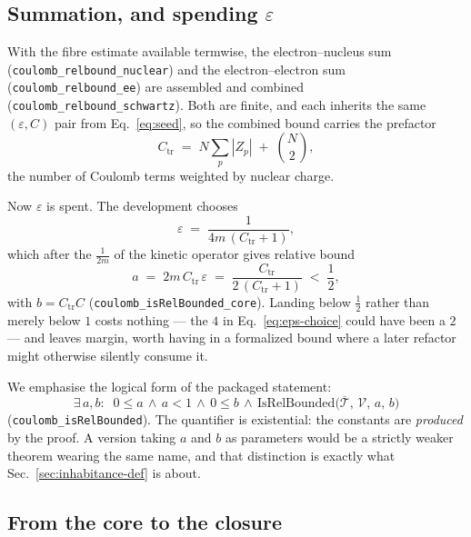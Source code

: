 \documentclass[aps,prd,reprint,nofootinbib,superscriptaddress]{revtex4-2}
\newcommand{\thm}[1]{\texttt{#1}}   %
\begin{document}
\subsection{Summation, and spending $\varepsilon$}
\label{sec:summation}

With the fibre estimate available termwise, the electron--nucleus sum
(\thm{coulomb\_relbound\_nuclear}) and the electron--electron sum (\thm{coulomb\_relbound\_ee}) are
assembled and combined (\thm{coulomb\_relbound\_schwartz}). Both are finite, and each inherits the
same $(\varepsilon,C)$ pair from Eq.~\eqref{eq:seed}, so the combined bound carries the prefactor
\begin{equation}
C_{\mathrm{tr}} \;=\; N\sum_{p}|Z_{p}| \;+\; \binom{N}{2},
\label{eq:ctr}
\end{equation}
the number of Coulomb terms weighted by nuclear charge.

Now $\varepsilon$ is spent. The development chooses
\begin{equation}
\varepsilon \;=\; \frac{1}{4m\,(C_{\mathrm{tr}}+1)},
\label{eq:eps-choice}
\end{equation}
which after the $\tfrac{1}{2m}$ of the kinetic operator gives relative bound
\begin{equation}
a \;=\; 2m\,C_{\mathrm{tr}}\,\varepsilon
\;=\; \frac{C_{\mathrm{tr}}}{2\,(C_{\mathrm{tr}}+1)}
\;<\; \frac{1}{2},
\label{eq:a-value}
\end{equation}
with $b=C_{\mathrm{tr}}C$ (\thm{coulomb\_isRelBounded\_core}). Landing below $\tfrac12$ rather than
merely below $1$ costs nothing --- the $4$ in Eq.~\eqref{eq:eps-choice} could have been a $2$ --- and
leaves margin, worth having in a formalized bound where a later refactor might otherwise silently
consume it.

We emphasise the logical form of the packaged statement:
\begin{equation}
\exists\, a,b:\;\; 0\le a \,\wedge\, a<1 \,\wedge\, 0\le b \,\wedge\,
\mathrm{IsRelBounded}\bigl(\overline{\mathcal{T}},\,\mathcal{V},\,a,\,b\bigr)
\label{eq:coulomb-relbound}
\end{equation}
(\thm{coulomb\_isRelBounded}). The quantifier is existential: the constants are \emph{produced} by
the proof. A version taking $a$ and $b$ as parameters would be a strictly weaker theorem wearing the
same name, and that distinction is exactly what Sec.~\ref{sec:inhabitance-def} is about.

\subsection{From the core to the closure}
\label{sec:extend-closure}
\end{document}
